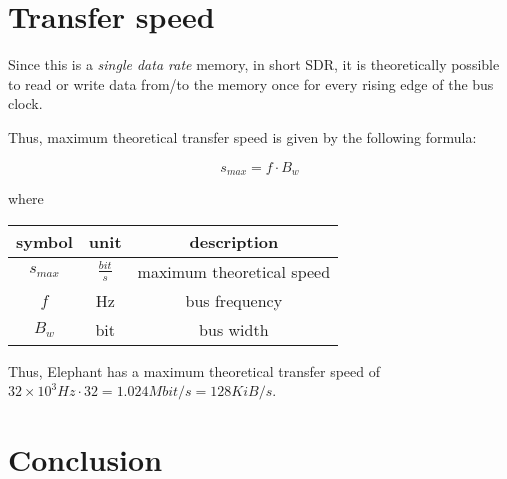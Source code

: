 \documentclass[a4paper,12pt]{article}
\newcommand{\memoryname}{Elephant}
\begin{document}

\section{Transfer speed}
Since this is a \emph{single data rate} memory, in short SDR, it is theoretically possible to read or write data from/to the memory once for every rising edge of the bus clock.

Thus, maximum theoretical transfer speed is given by the following formula:

$$ s_{max} =  f \cdot B_w $$

where

\bgroup
\def\arraystretch{1.5}
\begin{table}[H]
\center
\begin{tabular}{| c | c | c |}\hline
\textbf{symbol} & \textbf{unit} & \textbf{description} \\ \hline
$ s_{max} $ & $ \frac{bit}{s} $ & maximum theoretical speed \\ \hline
$ f $ & Hz & bus frequency \\ \hline
$ B_{w} $ & bit & bus width \\ \hline
\end{tabular}
\end{table}
\egroup

Thus, \memoryname{} has a maximum theoretical transfer speed of $32 \times 10^{3} Hz \cdot 32 = 1.024 Mbit/s = 128 KiB/s $.

\section{Conclusion}
\end{document}
